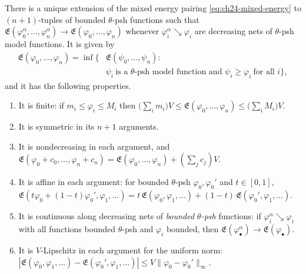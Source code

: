 \begin{theorem}
\label{thm:ch24-energy-extension}
There is a unique extension of the mixed energy pairing
\eqref{eq:ch24-mixed-energy} to \((n+1)\)-tuples of bounded \(\theta\)-psh
functions such that
\(\mathfrak E(\varphi^\alpha_0,\ldots,\varphi^\alpha_n)\to
 \mathfrak E(\varphi_0,\ldots,\varphi_n)\)
whenever \(\varphi_i^\alpha\searrow\varphi_i\) are decreasing nets of
\(\theta\)-psh model functions.  It is given by
\begin{equation}
\label{eq:ch24-energy-inf}
 \begin{aligned}
 \mathfrak E(\varphi_0,\ldots,\varphi_n)
 =\inf\bigl\{&\mathfrak E(\psi_0,\ldots,\psi_n):\\
 &\psi_i\ \text{is a \(\theta\)-psh model function and }
   \psi_i\geq\varphi_i\ \text{for all }i\bigr\},
 \end{aligned}
\end{equation}
and it has the following properties.
\begin{enumerate}
\item\label{itm:ch24-ee:finite} It is finite: if \(m_i\leq\varphi_i\leq M_i\)
 then
 \(\bigl(\sum_im_i\bigr)V\leq\mathfrak E(\varphi_0,\ldots,\varphi_n)
   \leq\bigl(\sum_iM_i\bigr)V\).
\item\label{itm:ch24-ee:sym} It is symmetric in its \(n+1\) arguments.
\item\label{itm:ch24-ee:mono} It is nondecreasing in each argument, and
 \(\mathfrak E(\varphi_0+c_0,\ldots,\varphi_n+c_n)
   =\mathfrak E(\varphi_0,\ldots,\varphi_n)+(\sum_jc_j)V\).
\item\label{itm:ch24-ee:affine} It is affine in each argument: for bounded
 \(\theta\)-psh \(\varphi_0,\varphi_0'\) and \(t\in[0,1]\),
 \(\mathfrak E(t\varphi_0+(1-t)\varphi_0',\varphi_1,\ldots)
  =t\,\mathfrak E(\varphi_0,\varphi_1,\ldots)
   +(1-t)\,\mathfrak E(\varphi_0',\varphi_1,\ldots)\).
\item\label{itm:ch24-ee:nets} It is continuous along decreasing nets of
 \emph{bounded \(\theta\)-psh} functions: if
 \(\varphi_i^\alpha\searrow\varphi_i\) with all functions bounded
 \(\theta\)-psh and \(\varphi_i\) bounded, then
 \(\mathfrak E(\varphi_\bullet^\alpha)\to\mathfrak E(\varphi_\bullet)\).
\item\label{itm:ch24-ee:lip} It is \(V\)-Lipschitz in each argument for the
 uniform norm:
 \(|\mathfrak E(\varphi_0,\varphi_1,\ldots)
  -\mathfrak E(\varphi_0',\varphi_1,\ldots)|
  \leq V\|\varphi_0-\varphi_0'\|_\infty\).
\end{enumerate}
\end{theorem}


